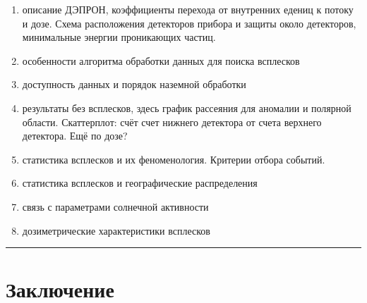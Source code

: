 \documentclass[]{article}
\begin{document}
\begin{enumerate}
\def\labelenumi{\arabic{enumi}.}
\item
  описание ДЭПРОН, коэффициенты перехода от внутренних едениц к потоку и
  дозе. Схема расположения детекторов прибора и защиты около детекторов,
  минимальные энергии проникающих частиц.
\item
  особенности алгоритма обработки данных для поиска всплесков
\item
  доступность данных и порядок наземной обработки
\item
  результаты без всплесков, здесь график рассеяния для аномалии и
  полярной области. Скаттерплот: счёт счет нижнего детектора от счета
  верхнего детектора. Ещё по дозе?
\item
  статистика всплесков и их феноменология. Критерии отбора событий.
\item
  статистика всплесков и географические распределения
\item
  связь с параметрами солнечной активности
\item
  дозиметрические характеристики всплесков
\end{enumerate}

\begin{center}\rule{0.5\linewidth}{\linethickness}\end{center}

\section{Заключение}\label{header-n53}
\end{document}

